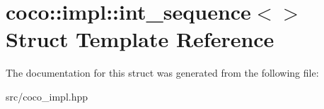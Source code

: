 \hypertarget{structcoco_1_1impl_1_1int__sequence}{}\section{coco\+:\+:impl\+:\+:int\+\_\+sequence$<$$>$ Struct Template Reference}
\label{structcoco_1_1impl_1_1int__sequence}


The documentation for this struct was generated from the following file\+:\begin{DoxyCompactItemize}
\item 
src/coco\+\_\+impl.\+hpp\end{DoxyCompactItemize}
